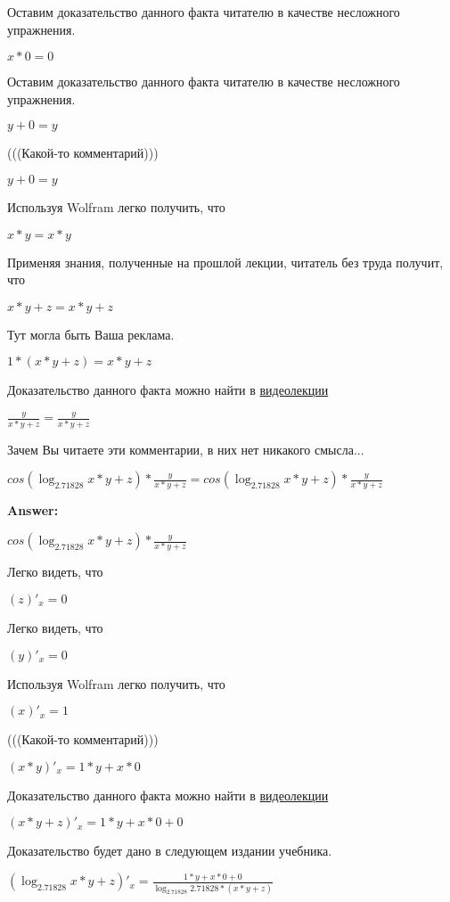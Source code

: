 \documentclass[12pt,a4paper,fleqn]{article}
\theoremstyle{definition}
\begin{document}
Оставим доказательство данного факта читателю в качестве несложного упражнения. 

$ x  *  0  =  0 $

Оставим доказательство данного факта читателю в качестве несложного упражнения. 

$ y  +  0  =  y $

(((Какой-то комментарий))) 

$ y  +  0  =  y $

Используя Wolfram легко получить, что 

$ x  *  y  =  x  *  y $

Применяя знания, полученные на прошлой лекции, читатель без труда получит, что 

$ x  *  y  +  z  =  x  *  y  +  z $

Тут могла быть Ваша реклама. 

$ 1  * ( x  *  y  +  z ) =  x  *  y  +  z $

Доказательство данного факта можно найти в \href{https://www.youtube.com/watch?v=dQw4w9WgXcQ}{видеолекции} 

$\frac{ y }{ x  *  y  +  z }
 = \frac{ y }{ x  *  y  +  z }
$

Зачем Вы читаете эти комментарии, в них нет никакого смысла... 

$cos(\log_{ 2.71828 }{ x  *  y  +  z }) * \frac{ y }{ x  *  y  +  z }
 = cos(\log_{ 2.71828 }{ x  *  y  +  z }) * \frac{ y }{ x  *  y  +  z }
$


\textbf{Answer:}

$cos(\log_{ 2.71828 }{ x  *  y  +  z }) * \frac{ y }{ x  *  y  +  z }
$

Легко видеть, что 

$( z )'_{x} =  0 $

Легко видеть, что 

$( y )'_{x} =  0 $

Используя Wolfram легко получить, что 

$( x )'_{x} =  1 $

(((Какой-то комментарий))) 

$( x  *  y )'_{x} =  1  *  y  +  x  *  0 $

Доказательство данного факта можно найти в \href{https://www.youtube.com/watch?v=dQw4w9WgXcQ}{видеолекции} 

$( x  *  y  +  z )'_{x} =  1  *  y  +  x  *  0  +  0 $

Доказательство будет дано в следующем издании учебника. 

$(\log_{ 2.71828 }{ x  *  y  +  z })'_{x} = \frac{ 1  *  y  +  x  *  0  +  0 }{\log_{ 2.71828 }{ 2.71828 } * ( x  *  y  +  z )}
$
\end{document}
